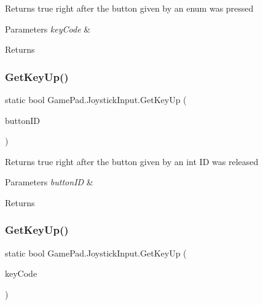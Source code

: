 Returns true right after the button given by an enum was pressed 


\begin{DoxyParams}{Parameters}
{\em key\+Code} & \\
\hline
\end{DoxyParams}
\begin{DoxyReturn}{Returns}

\end{DoxyReturn}
\mbox{\label{class_game_pad_1_1_joystick_input_af9c09186831c47ce815527453bbfca61}} 
\subsubsection{\texorpdfstring{GetKeyUp()}{GetKeyUp()}\hspace{0.1cm}{\footnotesize\ttfamily [1/2]}}
{\footnotesize\ttfamily static bool Game\+Pad.\+Joystick\+Input.\+Get\+Key\+Up (\begin{DoxyParamCaption}\item[{int}]{button\+ID }\end{DoxyParamCaption})\hspace{0.3cm}{\ttfamily [static]}}



Returns true right after the button given by an int ID was released 


\begin{DoxyParams}{Parameters}
{\em button\+ID} & \\
\hline
\end{DoxyParams}
\begin{DoxyReturn}{Returns}

\end{DoxyReturn}
\mbox{\label{class_game_pad_1_1_joystick_input_a373bc1035227b3ed1b03600610fe3d30}} 
\subsubsection{\texorpdfstring{GetKeyUp()}{GetKeyUp()}\hspace{0.1cm}{\footnotesize\ttfamily [2/2]}}
{\footnotesize\ttfamily static bool Game\+Pad.\+Joystick\+Input.\+Get\+Key\+Up (\begin{DoxyParamCaption}\item[{\mbox{\hyperlink{namespace_game_pad_ac76b16e8c3ac78facd993c355ab2c337}{Joystick\+Key\+Code}}}]{key\+Code }\end{DoxyParamCaption})\hspace{0.3cm}{\ttfamily [static]}}



